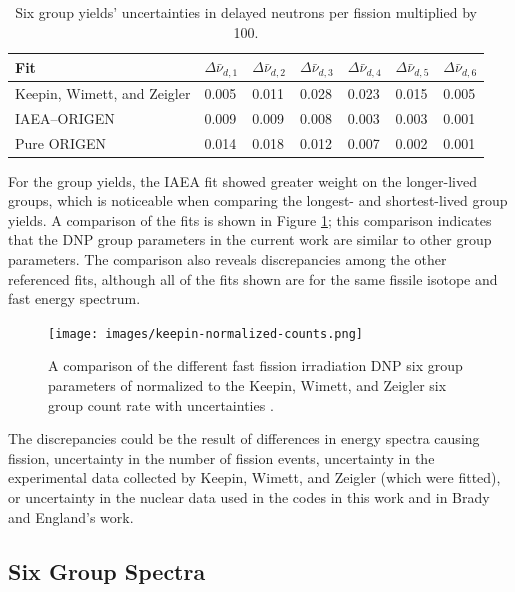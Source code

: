 \documentclass{style/nseJournal}
\begin{document}
\begin{table}[]
\caption{Six group yields' uncertainties in delayed neutrons per fission multiplied by 100.}
\centering
\begin{tabular}{|l l l l l l l|} 
 \hline
 Fit & $\Delta \bar{\nu}_{d, 1}$ & $\Delta \bar{\nu}_{d, 2}$ & $\Delta \bar{\nu}_{d, 3}$ & $\Delta \bar{\nu}_{d, 4}$ & $\Delta \bar{\nu}_{d, 5}$ & $\Delta \bar{\nu}_{d, 6}$\\
 \hline\hline
    Keepin, Wimett, and Zeigler \cite{KEEPIN1957IN2} & 0.005 & 0.011 & 0.028 & 0.023 & 0.015 & 0.005\\
    IAEA--ORIGEN & 0.009 & 0.009 & 0.008 & 0.003 & 0.003 & 0.001 \\
    Pure ORIGEN& 0.014 & 0.018 & 0.012 & 0.007 & 0.002 & 0.001\\
 \hline
\end{tabular}
\label{table:group-yields-delta}
\end{table}


For the group yields, the IAEA fit showed greater weight on the longer-lived groups, which is noticeable when comparing the longest- and shortest-lived group yields. A comparison of the fits is shown in Figure \ref{fig:keepnorm}; this comparison indicates that the DNP group parameters in the current work are similar to other group parameters. The comparison also reveals discrepancies among the other referenced fits, although all of the fits shown are for the same fissile isotope and fast energy spectrum.

\begin{figure}[]
\centering
\texttt{[image: images/keepin-normalized-counts.png]}
\caption{A comparison of the different fast fission irradiation DNP six group parameters of  normalized to the Keepin, Wimett, and Zeigler six group count rate with uncertainties \cite{KEEPIN1957IN2}.}
\label{fig:keepnorm}
\end{figure}

The discrepancies could be the result of differences in energy spectra causing fission, uncertainty in the number of fission events, uncertainty in the experimental data collected by Keepin, Wimett, and Zeigler (which were fitted), or uncertainty in the nuclear data used in the codes in this work and in Brady and England's work.

\subsection{Six Group Spectra}
\end{document}
